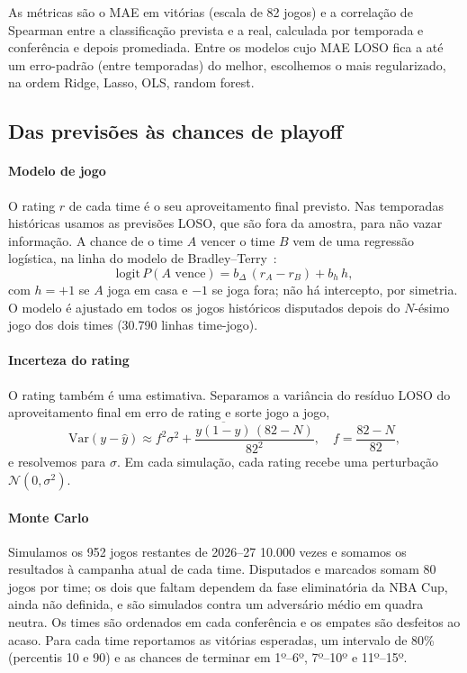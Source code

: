 \documentclass[conference]{IEEEtran}
\begin{document}
As métricas são o MAE em vitórias (escala de 82 jogos) e a correlação de Spearman entre a classificação prevista e a real, calculada por temporada e conferência e depois promediada. Entre os modelos cujo MAE LOSO fica a até um erro-padrão (entre temporadas) do melhor, escolhemos o mais regularizado, na ordem Ridge, Lasso, OLS, random forest.

\subsection{Das previsões às chances de playoff}
\paragraph{Modelo de jogo} O rating $r$ de cada time é o seu aproveitamento final previsto. Nas temporadas históricas usamos as previsões LOSO, que são fora da amostra, para não vazar informação. A chance de o time $A$ vencer o time $B$ vem de uma regressão logística, na linha do modelo de Bradley--Terry~\cite{bradley1952}:
\begin{equation}
\mathrm{logit}\,P(A \text{ vence}) = b_{\Delta}\,(r_A - r_B) + b_{h}\,h,
\label{eq:logit}
\end{equation}
com $h=+1$ se $A$ joga em casa e $-1$ se joga fora; não há intercepto, por simetria. O modelo é ajustado em todos os jogos históricos disputados depois do $N$-ésimo jogo dos dois times (30.790 linhas time-jogo).

\paragraph{Incerteza do rating} O rating também é uma estimativa. Separamos a variância do resíduo LOSO do aproveitamento final em erro de rating e sorte jogo a jogo,
\begin{equation}
\mathrm{Var}(y-\hat y) \approx f^2\sigma^2 + \frac{\overline{y(1-y)}\,(82-N)}{82^2}, \quad f=\frac{82-N}{82},
\label{eq:sigma}
\end{equation}
e resolvemos para $\sigma$. Em cada simulação, cada rating recebe uma perturbação $\mathcal{N}(0,\sigma^2)$.

\paragraph{Monte Carlo} Simulamos os 952 jogos restantes de 2026--27 10.000 vezes e somamos os resultados à campanha atual de cada time. Disputados e marcados somam 80 jogos por time; os dois que faltam dependem da fase eliminatória da NBA Cup, ainda não definida, e são simulados contra um adversário médio em quadra neutra. Os times são ordenados em cada conferência e os empates são desfeitos ao acaso. Para cada time reportamos as vitórias esperadas, um intervalo de 80\% (percentis 10 e 90) e as chances de terminar em 1º--6º, 7º--10º e 11º--15º.
\end{document}
